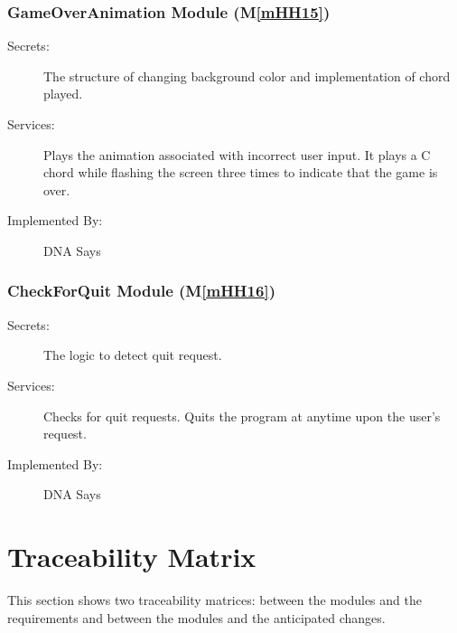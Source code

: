 \documentclass[12pt, titlepage]{article}
\newcommand{\mref}[1]{M\ref{#1}}
\begin{document}
\subsubsection{GameOverAnimation Module (\mref{mHH15})}
\begin{description}
\item[Secrets:]The structure of changing background color and implementation of chord played.
\item[Services:]Plays the animation associated with incorrect user input. It plays a C chord while flashing the screen three times to indicate that the game is over.
\item[Implemented By:] DNA Says
\end{description}

\subsubsection{CheckForQuit Module (\mref{mHH16})}
\begin{description}
\item[Secrets:]The logic to detect quit request.
\item[Services:]Checks for quit requests. Quits the program at anytime upon the user's request.
\item[Implemented By:] DNA Says
\end{description}



\section{Traceability Matrix} \label{SecTM}

This section shows two traceability matrices: between the modules and the
requirements and between the modules and the anticipated changes.
\end{document}
